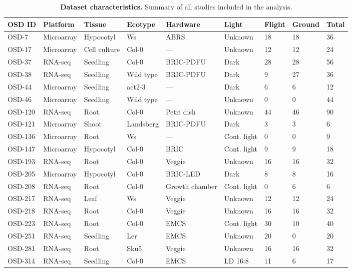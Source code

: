 \documentclass[11pt,a4paper]{article}
\begin{document}
\begin{table}[htbp]
\centering
\caption{\textbf{Dataset characteristics.} Summary of all studies included in the analysis.}
\small
\begin{tabular}{lllllllll}
\toprule
\textbf{OSD ID} & \textbf{Platform} & \textbf{Tissue} & \textbf{Ecotype} & \textbf{Hardware} & \textbf{Light} & \textbf{Flight} & \textbf{Ground} & \textbf{Total} \\
\midrule
OSD-7 & Microarray & Hypocotyl & Ws & ABRS & Unknown & 18 & 18 & 36 \\
OSD-17 & Microarray & Cell culture & Col-0 & --- & Unknown & 12 & 12 & 24 \\
OSD-37 & RNA-seq & Seedling & Col-0 & BRIC-PDFU & Dark & 28 & 28 & 56 \\
OSD-38 & RNA-seq & Seedling & Wild type & BRIC-PDFU & Dark & 9 & 27 & 36 \\
OSD-44 & Microarray & Seedling & act2-3 & --- & Dark & 6 & 6 & 12 \\
OSD-46 & Microarray & Seedling & Wild type & --- & Unknown & 0 & 0 & 44 \\
OSD-120 & RNA-seq & Root & Col-0 & Petri dish & Unknown & 44 & 46 & 90 \\
OSD-121 & Microarray & Shoot & Landsberg & BRIC-PDFU & Dark & 3 & 3 & 6 \\
OSD-136 & Microarray & Root & Ws & --- & Cont. light & 0 & 0 & 9 \\
OSD-147 & Microarray & Hypocotyl & Col-0 & BRIC & Cont. light & 9 & 9 & 18 \\
OSD-193 & RNA-seq & Root & Col-0 & Veggie & Unknown & 16 & 16 & 32 \\
OSD-205 & Microarray & Hypocotyl & Col-0 & BRIC-LED & Dark & 8 & 8 & 16 \\
OSD-208 & RNA-seq & Root & Col-0 & Growth chamber & Cont. light & 0 & 6 & 6 \\
OSD-217 & RNA-seq & Leaf & Ws & Veggie & Unknown & 12 & 12 & 24 \\
OSD-218 & RNA-seq & Root & Col-0 & Veggie & Unknown & 16 & 16 & 32 \\
OSD-223 & RNA-seq & Root & Col-0 & EMCS & Cont. light & 30 & 10 & 40 \\
OSD-251 & RNA-seq & Seedling & Ler & EMCS & Unknown & 20 & 0 & 20 \\
OSD-281 & RNA-seq & Root & Sku5 & Veggie & Unknown & 16 & 16 & 32 \\
OSD-314 & RNA-seq & Seedling & Col-0 & EMCS & LD 16:8 & 11 & 6 & 17 \\

\end{tabular}
\end{table}
\end{document}
